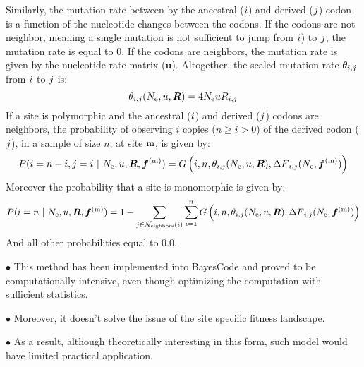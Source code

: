 Similarly, the mutation rate between by the ancestral (${i}$) and derived (${j}$) codon is a function of the nucleotide changes between the codons. If the codons are not neighbor, meaning a single mutation is not sufficient to jump from ${i}$) to ${j}$, the mutation rate is equal to $0$. If the codons are neighbors, the mutation rate is given by the nucleotide rate matrix ($ \bm{u} $). Altogether, the scaled mutation rate $\theta_{{i}, {j}}$ from ${i}$ to ${j}$ is:
\begin{equation}
	\theta_{{i}, {j}}(N_{\textrm{e}}, u, \bm{R}) = 4 N_{\textrm{e}} u R_{{i}, {j}}
\end{equation}
If a site is polymorphic and the ancestral (${i}$) and derived (${j}$) codons are neighbors, the probability of observing $i$ copies ($n \geq i > 0$) of the derived codon (${j}$), in a sample of size $n$, at site $\text{m}$, is given by:
\begin{equation}
	P({i}=n-i,{j}=i \ |\ N_{\textrm{e}}, u, \bm{R}, \bm{f}^{(\text{m})}) = G\left(i, n, \theta_{{i}, {j}}(N_{\textrm{e}}, u, \bm{R}), {\Delta F}_{{i}, {j}}(N_{\textrm{e}}, \bm{f}^{(\text{m})}) \right)
\end{equation}
Moreover the probability that a site is monomorphic is given by:
\begin{equation}
	P({i}= n \ |\ N_{\textrm{e}}, u, \bm{R}, \bm{f}^{(\text{m})}) = 1 - \sum\limits_{{j} \in \mathcal{N}_{\mathrm{eighbors}}\left({i}\right)} \sum\limits_{i=1}^{n} G\left(i, n, \theta_{{i}, {j}}(N_{\textrm{e}}, u, \bm{R}), {\Delta F}_{{i}, {j}}(N_{\textrm{e}}, \bm{f}^{(\text{m})})\right)
\end{equation}
And all other probabilities equal to $0.0$.

$\bullet$ This method has been implemented into BayesCode and proved to be computationally intensive, even though optimizing the computation with sufficient statistics.

$\bullet$ Moreover, it doesn't solve the issue of the site specific fitness landscape.

$\bullet$ As a result, although theoretically interesting in this form, such model would have limited practical application.

